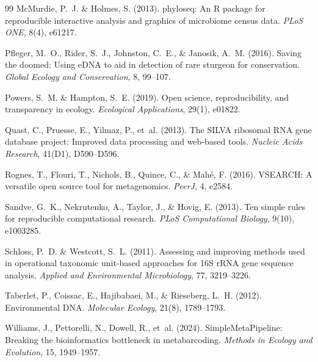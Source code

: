 \documentclass[11pt, a4paper]{article}
\begin{document}
\begin{thebibliography}{99}
McMurdie, P.~J. \& Holmes, S. (2013).
phyloseq: An R package for reproducible interactive analysis and
graphics of microbiome census data.
\textit{PLoS ONE}, 8(4), e61217.

Pfleger, M.~O., Rider, S.~J., Johnston, C.~E., \& Janosik, A.~M.
(2016). Saving the doomed: Using eDNA to aid in detection of rare
sturgeon for conservation.
\textit{Global Ecology and Conservation}, 8, 99--107.

Powers, S.~M. \& Hampton, S.~E. (2019).
Open science, reproducibility, and transparency in ecology.
\textit{Ecological Applications}, 29(1), e01822.

Quast, C., Pruesse, E., Yilmaz, P., et~al. (2013).
The SILVA ribosomal RNA gene database project: Improved data
processing and web-based tools.
\textit{Nucleic Acids Research}, 41(D1), D590--D596.

Rognes, T., Flouri, T., Nichols, B., Quince, C., \& Mah{\'e}, F.
(2016). VSEARCH: A versatile open source tool for metagenomics.
\textit{PeerJ}, 4, e2584.

Sandve, G.~K., Nekrutenko, A., Taylor, J., \& Hovig, E. (2013).
Ten simple rules for reproducible computational research.
\textit{PLoS Computational Biology}, 9(10), e1003285.

Schloss, P.~D. \& Westcott, S.~L. (2011).
Assessing and improving methods used in operational taxonomic
unit-based approaches for 16S rRNA gene sequence analysis.
\textit{Applied and Environmental Microbiology}, 77, 3219--3226.

Taberlet, P., Coissac, E., Hajibabaei, M., \& Rieseberg, L.~H.
(2012). Environmental DNA.
\textit{Molecular Ecology}, 21(8), 1789--1793.

Williams, J., Pettorelli, N., Dowell, R., et~al. (2024).
SimpleMetaPipeline: Breaking the bioinformatics bottleneck in
metabarcoding.
\textit{Methods in Ecology and Evolution}, 15, 1949--1957.

\end{thebibliography}
\end{document}
